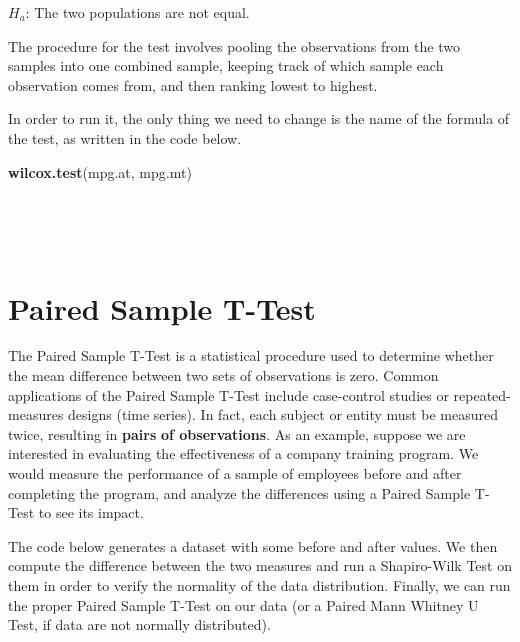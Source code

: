 \documentclass[
]{svmono}
\newenvironment{Shaded}{\begin{snugshade}}{\end{snugshade}}
\newcommand{\FunctionTok}[1]{\textcolor[rgb]{0.13,0.29,0.53}{\textbf{#1}}}
\newcommand{\NormalTok}[1]{#1}
\begin{document}
\(H_a\): The two populations are not equal.

The procedure for the test involves pooling the observations from the
two samples into one combined sample, keeping track of which sample each
observation comes from, and then ranking lowest to highest.

In order to run it, the only thing we need to change is the name of the
formula of the test, as written in the code below.

\begin{Shaded}
\begin{Highlighting}[]
\FunctionTok{wilcox.test}\NormalTok{(mpg.at, mpg.mt)}
\end{Highlighting}
\end{Shaded}

~

~
~

\hypertarget{paired-sample-t-test}{%
\section{Paired Sample T-Test}\label{paired-sample-t-test}}

The Paired Sample T-Test is a statistical procedure used to determine
whether the mean difference between two sets of observations is zero.
Common applications of the Paired Sample T-Test include case-control
studies or repeated-measures designs (time series). In fact, each
subject or entity must be measured twice, resulting in \textbf{pairs} \textbf{of
observations}. As an example, suppose we are interested in evaluating
the effectiveness of a company training program. We would measure the
performance of a sample of employees before and after completing the
program, and analyze the differences using a Paired Sample T-Test to see
its impact.

The code below generates a dataset with some before and after values. We
then compute the difference between the two measures and run a
Shapiro-Wilk Test on them in order to verify the normality of the data
distribution. Finally, we can run the proper Paired Sample T-Test on our
data (or a Paired Mann Whitney U Test, if data are not normally
distributed).
\end{document}
